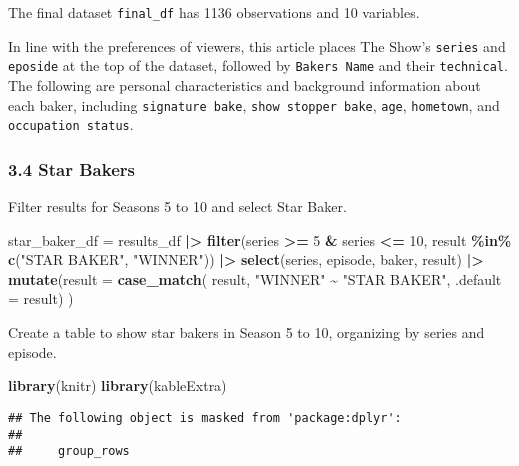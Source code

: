 \documentclass[
]{article}
\newenvironment{Shaded}{\begin{snugshade}}{\end{snugshade}}
\newcommand{\AttributeTok}[1]{\textcolor[rgb]{0.13,0.29,0.53}{#1}}
\newcommand{\DecValTok}[1]{\textcolor[rgb]{0.00,0.00,0.81}{#1}}
\newcommand{\FunctionTok}[1]{\textcolor[rgb]{0.13,0.29,0.53}{\textbf{#1}}}
\newcommand{\NormalTok}[1]{#1}
\newcommand{\OtherTok}[1]{\textcolor[rgb]{0.56,0.35,0.01}{#1}}
\newcommand{\SpecialCharTok}[1]{\textcolor[rgb]{0.81,0.36,0.00}{\textbf{#1}}}
\newcommand{\StringTok}[1]{\textcolor[rgb]{0.31,0.60,0.02}{#1}}
\begin{document}
The final dataset \texttt{final\_df} has 1136 observations and 10
variables.

In line with the preferences of viewers, this article places The Show's
\texttt{series} and \texttt{eposide} at the top of the dataset, followed
by \texttt{Bakers\textquotesingle{}\ Name} and their \texttt{technical}.
The following are personal characteristics and background information
about each baker, including \texttt{signature\ bake},
\texttt{show\ stopper\ bake}, \texttt{age}, \texttt{hometown}, and
\texttt{occupation\ status}.

\subsubsection{3.4 Star Bakers}\label{star-bakers}

Filter results for Seasons 5 to 10 and select Star Baker.

\begin{Shaded}
\begin{Highlighting}[]
\NormalTok{star\_baker\_df }\OtherTok{=}\NormalTok{ results\_df }\SpecialCharTok{|\textgreater{}}
  \FunctionTok{filter}\NormalTok{(series }\SpecialCharTok{\textgreater{}=} \DecValTok{5} \SpecialCharTok{\&}\NormalTok{ series }\SpecialCharTok{\textless{}=} \DecValTok{10}\NormalTok{, result }\SpecialCharTok{\%in\%} \FunctionTok{c}\NormalTok{(}\StringTok{"STAR BAKER"}\NormalTok{, }\StringTok{"WINNER"}\NormalTok{)) }\SpecialCharTok{|\textgreater{}}
  \FunctionTok{select}\NormalTok{(series, episode, baker, result) }\SpecialCharTok{|\textgreater{}}
  \FunctionTok{mutate}\NormalTok{(}\AttributeTok{result =} \FunctionTok{case\_match}\NormalTok{(}
\NormalTok{    result,}
    \StringTok{"WINNER"} \SpecialCharTok{\textasciitilde{}} \StringTok{"STAR BAKER"}\NormalTok{,}
    \AttributeTok{.default =}\NormalTok{ result)}
\NormalTok{  ) }
\end{Highlighting}
\end{Shaded}

Create a table to show star bakers in Season 5 to 10, organizing by
series and episode.

\begin{Shaded}
\begin{Highlighting}[]
\FunctionTok{library}\NormalTok{(knitr)}
\FunctionTok{library}\NormalTok{(kableExtra)}
\end{Highlighting}
\end{Shaded}

\begin{verbatim}
## The following object is masked from 'package:dplyr':
## 
##     group_rows
\end{verbatim}
\end{document}
